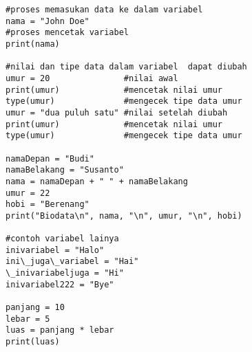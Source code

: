 \documentclass[12pt]{article}
\begin{document}
\begin{verbatim}
#proses memasukan data ke dalam variabel
nama = "John Doe"
#proses mencetak variabel
print(nama)

#nilai dan tipe data dalam variabel  dapat diubah
umur = 20               #nilai awal
print(umur)             #mencetak nilai umur
type(umur)              #mengecek tipe data umur
umur = "dua puluh satu" #nilai setelah diubah
print(umur)             #mencetak nilai umur
type(umur)              #mengecek tipe data umur

namaDepan = "Budi"
namaBelakang = "Susanto"
nama = namaDepan + " " + namaBelakang
umur = 22
hobi = "Berenang"
print("Biodata\n", nama, "\n", umur, "\n", hobi)

#contoh variabel lainya
inivariabel = "Halo"
ini\_juga\_variabel = "Hai"
\_inivariabeljuga = "Hi"
inivariabel222 = "Bye" 

panjang = 10
lebar = 5
luas = panjang * lebar
print(luas)
\end{verbatim}
\end{document}
